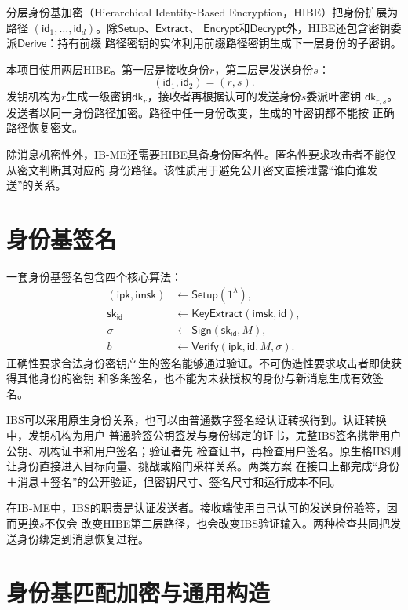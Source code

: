分层身份基加密（Hierarchical Identity-Based Encryption，HIBE）把身份扩展为路径
$(\mathsf{id}_1,\ldots,\mathsf{id}_d)$。除$\mathsf{Setup}$、$\mathsf{Extract}$、
$\mathsf{Encrypt}$和$\mathsf{Decrypt}$外，HIBE还包含密钥委派$\mathsf{Derive}$：持有前缀
路径密钥的实体利用前缀路径密钥生成下一层身份的子密钥。

本项目使用两层HIBE。第一层是接收身份$r$，第二层是发送身份$s$：
\[
  (\mathsf{id}_1,\mathsf{id}_2)=(r,s).
\]
发钥机构为$r$生成一级密钥$\mathsf{dk}_r$，接收者再根据认可的发送身份$s$委派叶密钥
$\mathsf{dk}_{r,s}$。发送者以同一身份路径加密。路径中任一身份改变，生成的叶密钥都不能按
正确路径恢复密文。

除消息机密性外，IB-ME还需要HIBE具备身份匿名性。匿名性要求攻击者不能仅从密文判断其对应的
身份路径。该性质用于避免公开密文直接泄露“谁向谁发送”的关系。

\section{身份基签名}

一套身份基签名包含四个核心算法：
\[
\begin{aligned}
 (\mathsf{ipk},\mathsf{imsk})&\leftarrow\mathsf{Setup}(1^\lambda),\\
 \mathsf{sk}_{\mathsf{id}}&\leftarrow\mathsf{KeyExtract}(\mathsf{imsk},\mathsf{id}),\\
 \sigma&\leftarrow\mathsf{Sign}(\mathsf{sk}_{\mathsf{id}},M),\\
 b&\leftarrow\mathsf{Verify}(\mathsf{ipk},\mathsf{id},M,\sigma).
\end{aligned}
\]
正确性要求合法身份密钥产生的签名能够通过验证。不可伪造性要求攻击者即使获得其他身份的密钥
和多条签名，也不能为未获授权的身份与新消息生成有效签名。

IBS可以采用原生身份关系，也可以由普通数字签名经认证转换得到。认证转换中，发钥机构为用户
普通验签公钥签发与身份绑定的证书，完整IBS签名携带用户公钥、机构证书和用户签名；验证者先
检查证书，再检查用户签名。原生格IBS则让身份直接进入目标向量、挑战或陷门采样关系。两类方案
在接口上都完成“身份＋消息＋签名”的公开验证，但密钥尺寸、签名尺寸和运行成本不同。

在IB-ME中，IBS的职责是认证发送者。接收端使用自己认可的发送身份验签，因而更换$s$不仅会
改变HIBE第二层路径，也会改变IBS验证输入。两种检查共同把发送身份绑定到消息恢复过程。

\section{身份基匹配加密与通用构造}

